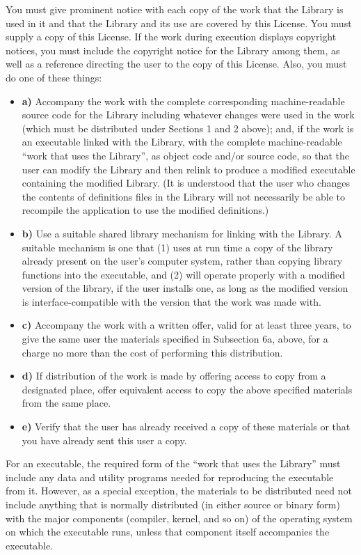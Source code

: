 {{{You must give prominent notice with each copy of the work that the Library is
used in it and that the Library and its use are covered by this License. You
must supply a copy of this License. If the work during execution displays
copyright notices, you must include the copyright notice for the Library among
them, as well as a reference directing the user to the copy of this License.
Also, you must do one of these things: 

\begin{itemize}
\item {\bf a)} Accompany the work with the complete corresponding 
   machine-readable source code for the Library including whatever  changes were
   used in the work (which must be distributed under  Sections 1 and 2 above);
and, if the work is an executable linked  with the Library, with the complete
machine-readable ``work that  uses the Library'', as object code and/or source
code, so that the  user can modify the Library and then relink to produce a
modified  executable containing the modified Library. (It is understood  that
the user who changes the contents of definitions files in the  Library will
not necessarily be able to recompile the application  to use the modified
definitions.)  
\item {\bf b)} Use a suitable shared library mechanism for linking with the 
   Library. A suitable mechanism is one that (1) uses at run time a  copy of the
   library already present on the user's computer system,  rather than copying
library functions into the executable, and (2)  will operate properly with a
modified version of the library, if  the user installs one, as long as the
modified version is  interface-compatible with the version that the work was
made with.  
\item {\bf c)} Accompany the work with a written offer, valid for at  least
   three years, to give the same user the materials  specified in Subsection 6a,
   above, for a charge no more  than the cost of performing this distribution.  
\item {\bf d)} If distribution of the work is made by offering access to copy 
   from a designated place, offer equivalent access to copy the above  specified
   materials from the same place.  
\item {\bf e)} Verify that the user has already received a copy of these 
   materials or that you have already sent this user a copy. 
   \end{itemize}

For an executable, the required form of the ``work that uses the Library''
must include any data and utility programs needed for reproducing the
executable from it. However, as a special exception, the materials to be
distributed need not include anything that is normally distributed (in either
source or binary form) with the major components (compiler, kernel, and so on)
of the operating system on which the executable runs, unless that component
itself accompanies the executable. 

}}}
